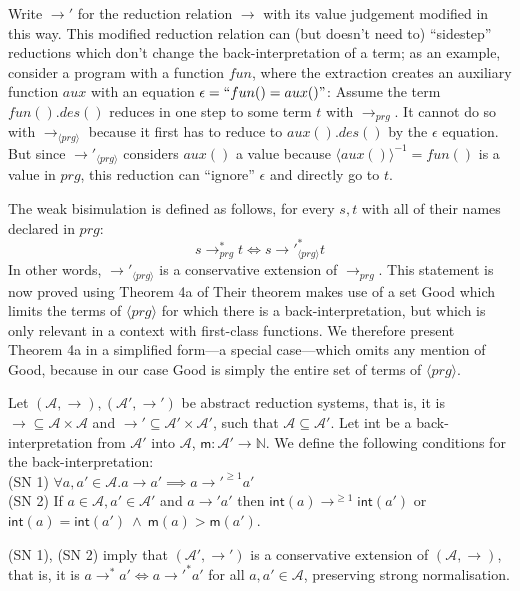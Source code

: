 Write $\longrightarrow'$ for the reduction relation $\longrightarrow$ with its value judgement modified in this way. This modified reduction relation can (but doesn't need to) ``sidestep'' reductions which don't change the back-interpretation of a term; as an example, consider a program with a function $fun$, where the extraction creates an auxiliary function $aux$ with an equation $\epsilon = ``fun() = aux()"$: Assume the term $fun().des()$ reduces in one step to some term $t$ with $\longrightarrow_{prg}$. It cannot do so with $\longrightarrow_{\langle prg \rangle}$ because it first has to reduce to $aux().des()$ by the $\epsilon$ equation. But since $\longrightarrow'_{\langle prg \rangle}$ considers $aux()$ a value because $\langle aux() \rangle^{-1} = fun()$ is a value in $prg$, this reduction can ``ignore'' $\epsilon$ and directly go to $t$.

The weak bisimulation is defined as follows, for every $s,t$ with all of their names declared in $prg$:
\begin{equation}
\label{eq:bisim1}
s \longrightarrow_{prg}^* t \iff s {\longrightarrow'}_{\langle prg \rangle}^* t
\end{equation}
In other words, $\longrightarrow'_{\langle prg \rangle}$ is a conservative extension of $\longrightarrow_{prg}$. This statement is now proved using Theorem 4a of \citet{setzer14unnesting} Their theorem makes use of a set \textsf{Good} which limits the terms of $\langle prg \rangle$ for which there is a back-interpretation, but which is only relevant in a context with first-class functions. We therefore present Theorem 4a in a simplified form---a special case---which omits any mention of \textsf{Good}, because in our case \textsf{Good} is simply the entire set of terms of $\langle prg \rangle$.

\begin{theorem}[Setzer et al.]
\label{thm:setzer4a}
Let $(\mathcal{A}, \longrightarrow), (\mathcal{A}', \longrightarrow')$ be abstract reduction systems, that is, it is $\longrightarrow \subseteq \mathcal{A} \times \mathcal{A}$ and $\longrightarrow' \subseteq \mathcal{A}' \times \mathcal{A}'$, such that $\mathcal{A} \subseteq \mathcal{A}'$. Let \textsf{int} be a back-interpretation from $\mathcal{A}'$ into $\mathcal{A}$, $\textsf{m} : \mathcal{A}' \to \mathbb{N}$. We define the following conditions for the back-interpretation:\\
(SN 1) $\forall a, a' \in \mathcal{A}. a \longrightarrow a' \implies a {\longrightarrow'}^{\geq 1} a'$\\
(SN 2) If $a \in \mathcal{A}, a' \in \mathcal{A}'$ and $a \longrightarrow' a'$ then $\textsf{int}(a) {\longrightarrow}^{\geq 1} \textsf{int}(a')$ or $\textsf{int}(a) = \textsf{int}(a') ~ \land ~ \textsf{m}(a) > \textsf{m}(a')$.

(SN 1), (SN 2) imply that $(\mathcal{A}', \longrightarrow')$ is a conservative extension of $(\mathcal{A}, \longrightarrow)$, that is, it is $a \longrightarrow^* a' \iff a {\longrightarrow'}^* a'$ for all $a, a' \in \mathcal{A}$, preserving strong normalisation.
\end{theorem}

